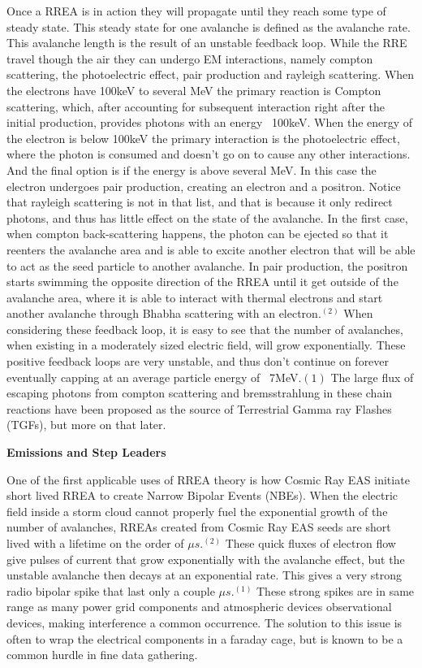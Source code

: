 \documentclass[11pt]{article}
\begin{document}
\begin{multicols*}{2}
    Once a RREA is in action they will propagate until they reach some type of steady state. This steady state for one avalanche is defined as the avalanche rate. This avalanche length is the result of an unstable feedback loop. While the RRE travel though the air they can undergo EM interactions, namely compton scattering, the photoelectric effect, pair production and rayleigh scattering. When the electrons have 100keV to several MeV the primary reaction is Compton scattering, which, after accounting for subsequent interaction right after the initial production, provides photons with an energy ~100keV. When the energy of the electron is below 100keV the primary interaction is the photoelectric effect, where the photon is consumed and doesn't go on to cause any other interactions. And the final option is if the energy is above several MeV. In this case the electron undergoes pair production, creating an electron and a positron. Notice that rayleigh scattering is not in that list, and that is because it only redirect photons, and thus has little effect on the state of the avalanche. In the first case, when compton back-scattering happens, the photon can be ejected so that it reenters the avalanche area and is able to excite another electron that will be able to act as the seed particle to another avalanche. In pair production, the positron starts swimming the opposite direction of the RREA until it get outside of the avalanche area, where it is able to interact with thermal electrons and start another avalanche through Bhabha scattering with an electron.$^{(2)}$ When considering these feedback loop, it is easy to see that the number of avalanches, when existing in a moderately sized electric field, will grow exponentially. These positive feedback loops are very unstable, and thus don't continue on forever eventually capping at an average particle energy of ~7MeV.${(1)}$ The large flux of escaping photons from compton scattering and bremsstrahlung in these chain reactions have been proposed as the source of Terrestrial Gamma ray Flashes (TGFs), but more on that later. 
    \newline
    

    \noindent
{\bf \LARGE Emissions and Step Leaders}
    
    One of the first applicable uses of RREA theory is how Cosmic Ray EAS initiate short lived RREA to create Narrow Bipolar Events (NBEs). When the electric field inside a storm cloud cannot properly fuel the exponential growth of the number of avalanches, RREAs created from Cosmic Ray EAS seeds are short lived with a lifetime on the order of $\mu s$.$^{(2)}$ These quick fluxes of electron flow give pulses of current that grow exponentially with the avalanche effect, but the unstable avalanche then decays at an exponential rate. This gives a very strong radio bipolar spike that last only a couple $\mu s$.$^{(1)}$ These strong spikes are in same range as many power grid components and atmospheric devices observational devices, making interference a common occurrence. The solution to this issue is often to wrap the electrical components in a faraday cage, but is known to be a common hurdle in fine data gathering. 
    

\end{multicols*}
\end{document}
